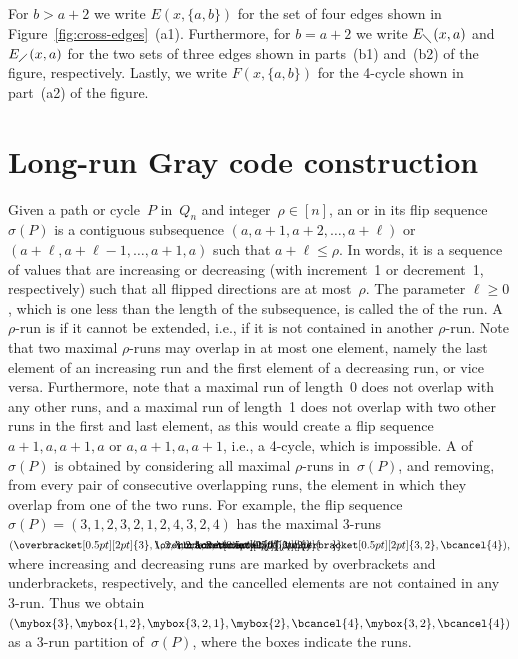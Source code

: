 %
For $b>a+2$ we write $E(x,\{a,b\})$ for the set of four edges shown in Figure~\ref{fig:cross-edges}~(a1).
Furthermore, for $b=a+2$ we write $E_{\diagdown}(x,a)$ and~$E_{\diagup}(x,a)$ for the two sets of three edges shown in parts~(b1) and~(b2) of the figure, respectively.
Lastly, we write $F(x,\{a,b\})$ for the 4-cycle shown in part~(a2) of the figure.
%
%
\section{Long-run Gray code construction}
\label{sec:run}
%
Given a path or cycle~$P$ in~$Q_n$ and integer~$\rho\in[n]$, an  or  in its flip sequence~$\sigma(P)$ is a contiguous subsequence $(a,a+1,a+2,\ldots,a+\ell)$ or $(a+\ell,a+\ell-1,\ldots,a+1,a)$ such that $a+\ell\leq \rho$.
In words, it is a sequence of values that are increasing or decreasing (with increment~1 or decrement~1, respectively) such that all flipped directions are at most~$\rho$.
The parameter $\ell\geq 0$, which is one less than the length of the subsequence, is called the  of the run.
%
A $\rho$-run is  if it cannot be extended, i.e., if it is not contained in another $\rho$-run.
Note that two maximal $\rho$-runs may overlap in at most one element, namely the last element of an increasing run and the first element of a decreasing run, or vice versa.
Furthermore, note that a maximal run of length~0 does not overlap with any other runs, and a maximal run of length~1 does not overlap with two other runs in the first and last element, as this would create a flip sequence $a+1,a,a+1,a$ or $a,a+1,a,a+1$, i.e., a 4-cycle, which is impossible.
A  of~$\sigma(P)$ is obtained by considering all maximal $\rho$-runs in~$\sigma(P)$, and removing, from every pair of consecutive overlapping runs, the element in which they overlap from one of the two runs.
For example, the flip sequence $\sigma(P)=(3,1,2,3,2,1,2,4,3,2,4)$ has the maximal 3-runs
$
(\overbracket[0.5pt][2pt]{3},\lefteqn{\overbracket[0.5pt][2pt]{\phantom{1,2,3}}}1,2,\lefteqn{\underbracket[0.5pt][2pt]{\phantom{3,2,1}}}3,2,\lefteqn{\overbracket[0.5pt][2pt]{\phantom{1,2}}}1,2,\bcancel{4},\underbracket[0.5pt][2pt]{3,2},\bcancel{4}),
$
where increasing and decreasing runs are marked by overbrackets and underbrackets, respectively, and the cancelled elements are not contained in any 3-run.
Thus we obtain $(\mybox{3},\mybox{1,2},\mybox{3,2,1},\mybox{2},\bcancel{4},\mybox{3,2},\bcancel{4})$ as a 3-run partition of~$\sigma(P)$, where the boxes indicate the runs.

